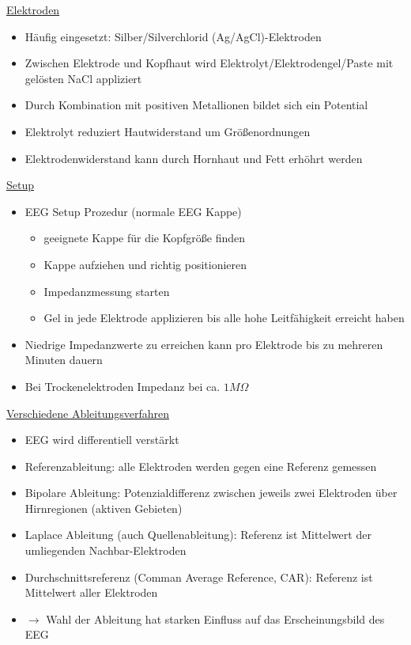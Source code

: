 \documentclass[a4paper,10pt,oneside]{article}
\begin{document}
\underline{Elektroden} \\
	\begin{itemize}
		\item Häufig eingesetzt: Silber/Silverchlorid (Ag/AgCl)-Elektroden
		\item Zwischen Elektrode und Kopfhaut wird Elektrolyt/Elektrodengel/Paste mit gelösten NaCl appliziert
		\item Durch Kombination mit positiven Metallionen bildet sich ein Potential
		\item Elektrolyt reduziert Hautwiderstand um Größenordnungen
		\item Elektrodenwiderstand kann durch Hornhaut und Fett erhöhrt werden
	\end{itemize}

\underline{Setup} \\
	\begin{itemize}
		\item EEG Setup Prozedur (normale EEG Kappe)
			\begin{itemize}
				\item geeignete Kappe für die Kopfgröße finden
				\item Kappe aufziehen und richtig positionieren
				\item Impedanzmessung starten
				\item Gel in jede Elektrode applizieren bis alle hohe Leitfähigkeit erreicht haben
			\end{itemize}
		\item Niedrige Impedanzwerte zu erreichen kann pro Elektrode bis zu mehreren Minuten dauern
		\item Bei Trockenelektroden Impedanz bei ca. $1M\Omega$
	\end{itemize}
	
\underline{Verschiedene Ableitungsverfahren} \\
	\begin{itemize}
		\item EEG wird differentiell verstärkt
		\item Referenzableitung: alle Elektroden werden gegen eine Referenz gemessen
		\item Bipolare Ableitung: Potenzialdifferenz zwischen jeweils zwei Elektroden über Hirnregionen (aktiven Gebieten)
		\item Laplace Ableitung (auch Quellenableitung): Referenz ist Mittelwert der umliegenden Nachbar-Elektroden
		\item Durchschnittsreferenz (Comman Average Reference, CAR): Referenz ist Mittelwert aller Elektroden
		\item $\rightarrow$ Wahl der Ableitung hat starken Einfluss auf das Erscheinungsbild des EEG
	\end{itemize}
	
\end{document}

